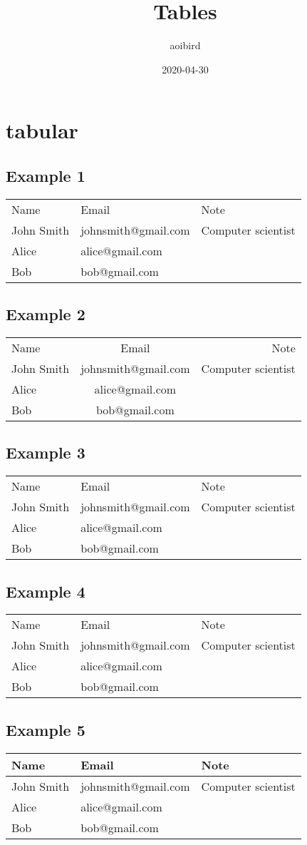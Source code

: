\documentclass{article}
\title{Tables}
\author{aoibird}
\date{2020-04-30}
\begin{document}
\maketitle

\section{tabular}

\subsection{Example 1}
\begin{tabular}{|l|l|l|}
  Name & Email & Note \\
  John Smith & johnsmith@gmail.com & Computer scientist \\
  Alice & alice@gmail.com & \\
  Bob & bob@gmail.com & \\
\end{tabular}

\subsection{Example 2}
\begin{tabular}{|l|c|r|}
  Name & Email & Note \\
  John Smith & johnsmith@gmail.com & Computer scientist \\
  Alice & alice@gmail.com & \\
  Bob & bob@gmail.com & \\
\end{tabular}

\subsection{Example 3}
\begin{tabular}{|l||l||l|}
  Name & Email & Note \\
  John Smith & johnsmith@gmail.com & Computer scientist \\
  Alice & alice@gmail.com & \\
  Bob & bob@gmail.com & \\
\end{tabular}

\subsection{Example 4}
\begin{tabular}{|l|l|p{5cm}|}
  Name & Email & Note \\
  John Smith & johnsmith@gmail.com & Computer scientist \\
  Alice & alice@gmail.com & \\
  Bob & bob@gmail.com & \\
\end{tabular}

\subsection{Example 5}
\begin{tabular}{|l|l|l|}
  \hline
  Name & Email & Note \\
  \hline
  John Smith & johnsmith@gmail.com & Computer scientist \\
  Alice & alice@gmail.com & \\
  Bob & bob@gmail.com & \\
  \hline
\end{tabular}
\end{document}
